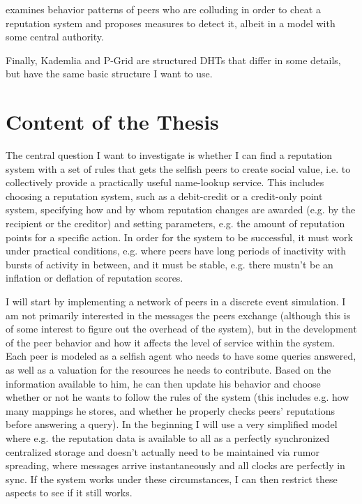 \documentclass[10pt]{article}
\begin{document}
\cite{li2012collusion} examines behavior patterns of peers who are colluding in
order to cheat a reputation system and proposes measures to detect it, albeit in
a model with some central authority.

Finally, Kademlia\cite{maymounkov2002kademlia} and P-Grid\cite{aberer2003p} are
structured DHTs that differ in some details, but have the same basic structure I
want to use.

\section*{Content of the Thesis}
The central question I want to investigate is whether I can find a reputation
system with a set of rules that gets the selfish peers to create social value,
i.e. to collectively provide a practically useful name-lookup service. This
includes choosing a reputation system, such as a debit-credit or a credit-only
point system, specifying how and by whom reputation changes are awarded (e.g. by
the recipient or the creditor) and setting parameters, e.g. the amount of
reputation points for a specific action. In order for the system to be
successful, it must work under practical conditions, e.g. where peers have long
periods of inactivity with bursts of activity in between, and it must be stable,
e.g. there mustn't be an inflation or deflation of reputation scores.

I will start by implementing a network of peers in a discrete event simulation.
I am not primarily interested in the messages the peers exchange (although this
is of some interest to figure out the overhead of the system), but in the
development of the peer behavior and how it affects the level of service within
the system. Each peer is modeled as a selfish agent who needs to have some
queries answered, as well as a valuation for the resources he needs to
contribute. Based on the information available to him, he can then update his
behavior and choose whether or not he wants to follow the rules of the system
(this includes e.g. how many mappings he stores, and whether he properly checks
peers' reputations before answering a query). In the beginning I will use a very
simplified model where e.g. the reputation data is available to all as a
perfectly synchronized centralized storage and doesn't actually need to be
maintained via rumor spreading, where messages arrive instantaneously and all
clocks are perfectly in sync. If the system works under these circumstances, I
can then restrict these aspects to see if it still works.
\end{document}
